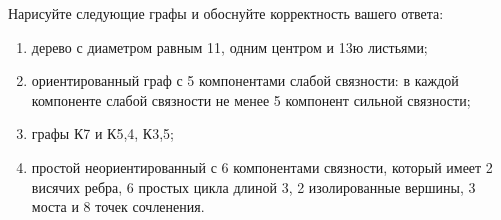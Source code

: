 \question 
Нарисуйте следующие графы и обоснуйте корректность вашего ответа:
\begin{enumerate}
\item  дерево с диаметром равным 11, одним центром  и  13ю листьями;
\item  ориентированный граф с 5 компонентами слабой связности: в  каждой компоненте слабой связности не менее 5 компонент сильной связности;
\item  графы К7 и К5,4, К3,5;
\item  простой неориентированный с 6 компонентами связности, который имеет 2 висячих ребра, 6 простых цикла длиной 3, 2 изолированные вершины, 3 моста и 8 точек сочленения.
\end{enumerate}